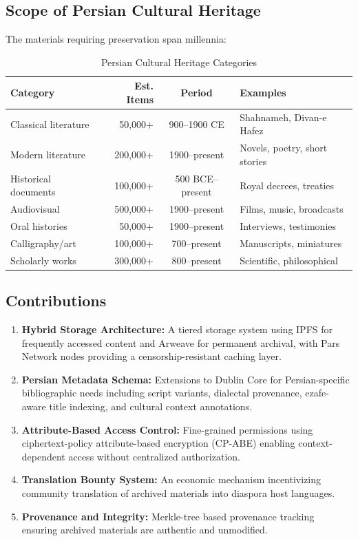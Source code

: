 \documentclass[11pt,a4paper]{article}
\begin{document}
\subsection{Scope of Persian Cultural Heritage}

The materials requiring preservation span millennia:

\begin{table}[H]
\centering
\caption{Persian Cultural Heritage Categories}
\label{tab:heritage}
\begin{tabular}{lrcl}
\toprule
\textbf{Category} & \textbf{Est. Items} & \textbf{Period} & \textbf{Examples} \\
\midrule
Classical literature & 50{,}000+ & 900--1900 CE & Shahnameh, Divan-e Hafez \\
Modern literature & 200{,}000+ & 1900--present & Novels, poetry, short stories \\
Historical documents & 100{,}000+ & 500 BCE--present & Royal decrees, treaties \\
Audiovisual & 500{,}000+ & 1900--present & Films, music, broadcasts \\
Oral histories & 50{,}000+ & 1900--present & Interviews, testimonies \\
Calligraphy/art & 100{,}000+ & 700--present & Manuscripts, miniatures \\
Scholarly works & 300{,}000+ & 800--present & Scientific, philosophical \\
\bottomrule
\end{tabular}
\end{table}

\subsection{Contributions}

\begin{enumerate}[label=(\roman*)]
    \item \textbf{Hybrid Storage Architecture:} A tiered storage system using IPFS for frequently accessed content and Arweave for permanent archival, with Pars Network nodes providing a censorship-resistant caching layer.
    \item \textbf{Persian Metadata Schema:} Extensions to Dublin Core for Persian-specific bibliographic needs including script variants, dialectal provenance, ezafe-aware title indexing, and cultural context annotations.
    \item \textbf{Attribute-Based Access Control:} Fine-grained permissions using ciphertext-policy attribute-based encryption (CP-ABE) enabling context-dependent access without centralized authorization.
    \item \textbf{Translation Bounty System:} An economic mechanism incentivizing community translation of archived materials into diaspora host languages.
    \item \textbf{Provenance and Integrity:} Merkle-tree based provenance tracking ensuring archived materials are authentic and unmodified.
\end{enumerate}
\end{document}
